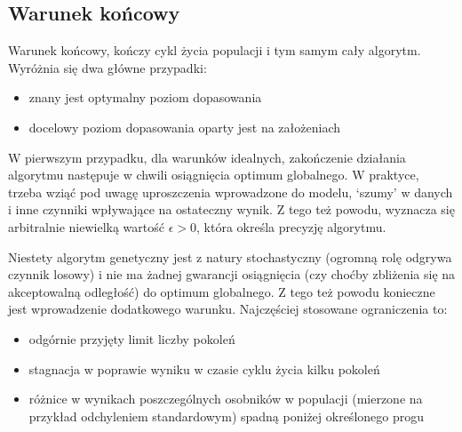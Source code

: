 \documentclass[a4paper,11pt]{article}
\begin{document}
    \subsection{Warunek końcowy}

    \noindent
    \begin{minipage}[H]{\textwidth}
        \setlength\parindent{17pt} Warunek końcowy, kończy cykl życia populacji i tym samym cały algorytm. Wyróżnia się dwa główne przypadki\cite{IntroductionToEvolutionaryComputing2015}:
        \begin{itemize}
            \item znany jest optymalny poziom dopasowania
            \item docelowy poziom dopasowania oparty jest na założeniach
        \end{itemize}
    \end{minipage}

    \bigskip

    W pierwszym przypadku, dla warunków idealnych, zakończenie działania algorytmu następuje w chwili osiągnięcia optimum globalnego. W praktyce, trzeba wziąć pod uwagę uproszczenia wprowadzone do modelu, `szumy' w danych i inne czynniki wpływające na ostateczny wynik. Z tego też powodu, wyznacza się arbitralnie niewielką wartość $\epsilon > 0$, która określa precyzję algorytmu\cite{IntroductionToEvolutionaryComputing2015}.

    \bigskip

    \noindent
    \begin{minipage}[H]{\textwidth}
        \setlength\parindent{17pt} Niestety algorytm genetyczny jest z natury stochastyczny (ogromną rolę odgrywa czynnik losowy) i nie ma żadnej gwarancji osiągnięcia (czy choćby zbliżenia się na akceptowalną odległość) do optimum globalnego. Z tego też powodu konieczne jest wprowadzenie dodatkowego warunku. Najczęściej stosowane ograniczenia to\cite{IntroductionToEvolutionaryComputing2015}:
        \begin{itemize}
            \item odgórnie przyjęty limit liczby pokoleń
            \item stagnacja w poprawie wyniku w czasie cyklu życia kilku pokoleń
            \item różnice w wynikach poszczególnych osobników w populacji (mierzone na przykład odchyleniem standardowym) spadną poniżej określonego progu
        \end{itemize}
    \end{minipage}
\end{document}

